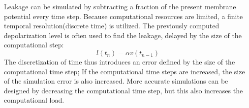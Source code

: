 	Leakage can be simulated by subtracting a fraction of the present membrane potential every time step.
	Because computational resources are limited, a finite temporal resolution(discrete time) is utilized.
	The previously computed depolarization level is often used to find the leakage, delayed by the size of the computational step:
\begin{equation}
	l(t_n) = \alpha v(t_{n-1})
\end{equation}
	The discretization of time thus introduces an error defined by the size of the computational time step;
		If the computational time steps are increased, the size of the simulation error is also increased.
	More accurate simulations can be designed by decreasing the computational time step, but this also increases the computational load.
	




